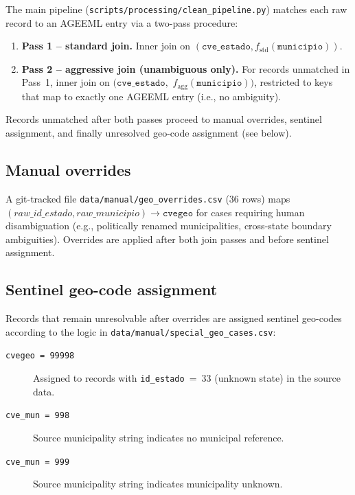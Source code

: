 \documentclass[3p]{elsarticle}
\begin{document}
The main pipeline (\texttt{scripts/processing/clean\_pipeline.py}) matches each
raw record to an AGEEML entry via a two-pass procedure:

\begin{enumerate}
  \item \textbf{Pass 1 – standard join.}
    Inner join on $(\texttt{cve\_estado}, f_{\text{std}}(\texttt{municipio}))$.

  \item \textbf{Pass 2 – aggressive join (unambiguous only).}
    For records unmatched in Pass~1, inner join on
    $(\texttt{cve\_estado},$ $f_{\text{agg}}(\texttt{municipio}))$,
    restricted to keys that map to exactly one AGEEML entry
    (i.e., no ambiguity).
\end{enumerate}

Records unmatched after both passes proceed to manual
  overrides, sentinel assignment, and finally unresolved
  geo-code assignment (see below).   

\subsection*{Manual overrides}

A git-tracked file \texttt{data/manual/geo\_overrides.csv} (36 rows)
maps $(raw\_id\_estado, raw\_municipio) \to \texttt{cvegeo}$
for cases requiring human disambiguation
(e.g., politically renamed municipalities, cross-state
boundary ambiguities).
Overrides are applied after both join passes and before
sentinel assignment.

\subsection*{Sentinel geo-code assignment}

Records that remain unresolvable after overrides are assigned
sentinel geo-codes according to the logic in
\texttt{data/manual/special\_geo\_cases.csv}:

\begin{description}
  \item[\texttt{cvegeo = 99998}]
    Assigned to records with \texttt{id\_estado}~=~33
    (unknown state) in the source data.

  \item[\texttt{cve\_mun = 998}]
    Source municipality string indicates no municipal reference.

  \item[\texttt{cve\_mun = 999}]
    Source municipality string indicates municipality unknown.
\end{description}
\end{document}

